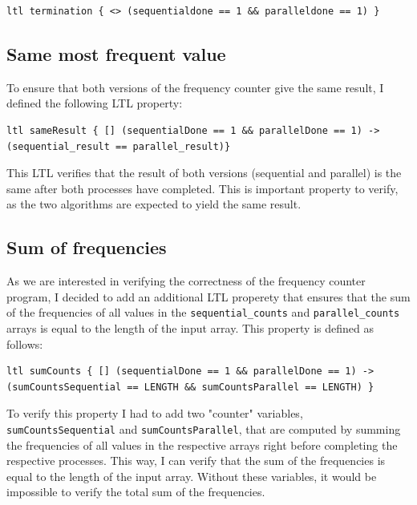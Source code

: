 \documentclass[a4paper, 11pt]{article}
\begin{document}
\begin{lstlisting}[language=Promela, caption={LTL property to verify the completition of both sequential and parallel processes}, captionpos=b, breaklines=true]
ltl termination { <> (sequentialdone == 1 && paralleldone == 1) }
\end{lstlisting}

\subsection{Same most frequent value}
\label{sec:ltl_same_result}

To ensure that both versions of the frequency counter give the same result, I defined the following LTL property:

\begin{lstlisting}[language=Promela, caption={LTL property to verify that both versions of the frequency counter give the same result}]
ltl sameResult { [] (sequentialDone == 1 && parallelDone == 1) -> (sequential_result == parallel_result)}
\end{lstlisting}

This LTL verifies that the result of both versions (sequential and parallel) is the same after both processes have completed. This is important property to verify, as the two algorithms are expected to yield the same result.

\subsection{Sum of frequencies}

As we are interested in verifying the correctness of the frequency counter program, I decided to add an additional LTL properety that ensures that the sum of the frequencies of all values in the \texttt{sequential\_counts} and \texttt{parallel\_counts} arrays is equal to the length of the input array. This property is defined as follows:

\begin{lstlisting}[language=Promela, caption={LTL properties to verify the sum of frequencies in the sequential and parallel arrays}, captionpos=b, breaklines=true]
ltl sumCounts { [] (sequentialDone == 1 && parallelDone == 1) -> (sumCountsSequential == LENGTH && sumCountsParallel == LENGTH) }
\end{lstlisting}

To verify this property I had to add two "counter" variables, \\ \texttt{sumCountsSequential} and \texttt{sumCountsParallel}, that are computed by summing the frequencies of all values in the respective arrays right before completing the respective processes. This way, I can verify that the sum of the frequencies is equal to the length of the input array. Without these variables, it would be impossible to verify the total sum of the frequencies.
\end{document}
